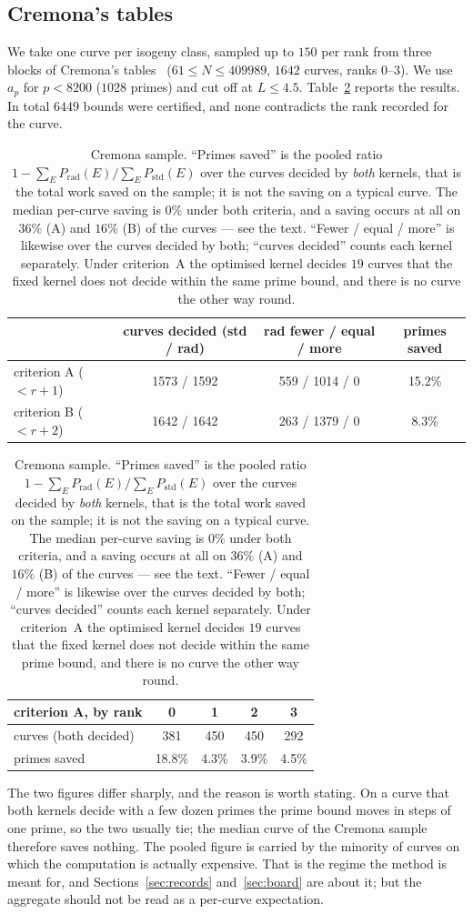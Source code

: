 \documentclass[11pt]{amsart}
\theoremstyle{remark}
\theoremstyle{definition}
\begin{document}
\subsection{Cremona's tables}
We take one curve per isogeny class, sampled up to $150$ per rank from three blocks of Cremona's tables~\cite{Cremona} ($61\le N\le 409989$, $1642$ curves, ranks $0$--$3$). We use $a_p$ for $p<8200$ ($1028$ primes) and cut off at $L\le 4.5$. Table~\ref{tab:cremona} reports the results. In total $6449$ bounds were certified, and none contradicts the rank recorded for the curve.

\begin{table}[h]
\centering\small
\begin{tabular}{lccc}
\toprule
 & curves decided (std / rad) & rad fewer / equal / more & primes saved\\
\midrule
criterion A ($<r+1$) & 1573 / 1592 & 559 / 1014 / 0 & 15.2\%\\
criterion B ($<r+2$) & 1642 / 1642 & 263 / 1379 / 0 & \phantom{1}8.3\%\\
\bottomrule
\end{tabular}

\smallskip
\begin{tabular}{lcccc}
\toprule
criterion A, by rank & 0 & 1 & 2 & 3\\
\midrule
curves (both decided) & 381 & 450 & 450 & 292\\
primes saved & 18.8\% & 4.3\% & 3.9\% & 4.5\%\\
\bottomrule
\end{tabular}
\caption{Cremona sample. ``Primes saved'' is the pooled ratio
$1-\sum_E P_{\mathrm{rad}}(E)/\sum_E P_{\mathrm{std}}(E)$ over the curves decided by \emph{both}
kernels, that is the total work saved on the sample; it is not the saving on a typical curve. The
median per-curve saving is $0\%$ under both criteria, and a saving occurs at all on $36\%$ (A) and
$16\%$ (B) of the curves --- see the text. ``Fewer / equal / more'' is likewise over the curves
decided by both; ``curves decided'' counts each kernel separately. Under criterion~A the optimised
kernel decides $19$ curves that the fixed kernel does not decide within the same prime bound, and
there is no curve the other way round.}
\label{tab:cremona}
\end{table}

The two figures differ sharply, and the reason is worth stating. On a curve that both kernels
decide with a few dozen primes the prime bound moves in steps of one prime, so the two usually tie;
the median curve of the Cremona sample therefore saves nothing. The pooled figure is carried by the
minority of curves on which the computation is actually expensive. That is the regime the method is
meant for, and Sections~\ref{sec:records} and~\ref{sec:board} are about it; but the aggregate should
not be read as a per-curve expectation.
\end{document}
